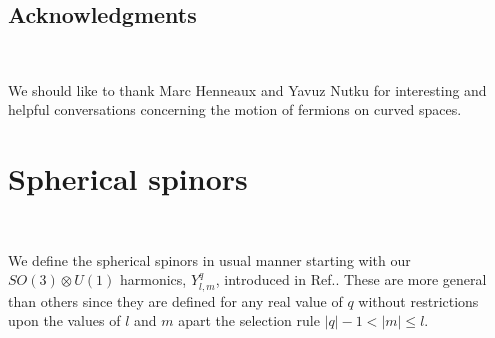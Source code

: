 \documentclass[a4paper,12pt]{article}
\begin{document}
\subsection*{Acknowledgments}
\

We should like to thank Marc Henneaux and Yavuz Nutku for interesting and
helpful conversations concerning the motion of fermions on curved spaces.



\appendix
\section{Spherical spinors}
\

We define the spherical spinors in  usual manner \cite{TH} starting with our 
$SO(3)\otimes U(1)$ harmonics, $Y^{q}_{l,m}$, introduced in Ref.\cite{CV}. 
These are more general than others \cite{HARM} since they are defined for  
any real value of $q$ without restrictions upon the values of $l$ and $m$ 
apart the selection rule $|q|-1<|m|\le l$. 
\end{document}
